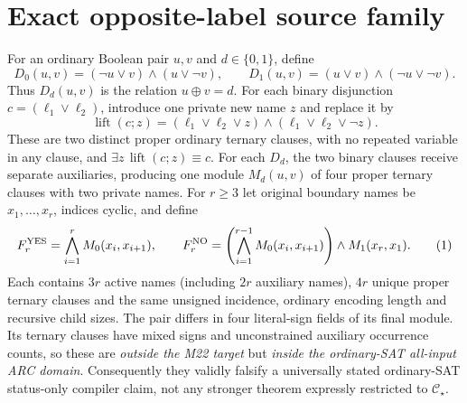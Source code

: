 \documentclass[11pt]{article}
\begin{document}
\section{Exact opposite-label source family}
For an ordinary Boolean pair \(u,v\) and \(d\in\{0,1\}\), define
\[
D_0(u,v)=(\neg u\vee v)\wedge(u\vee\neg v),\qquad
D_1(u,v)=(u\vee v)\wedge(\neg u\vee\neg v).
\]
Thus \(D_d(u,v)\) is the relation \(u\oplus v=d\).
For each binary disjunction \(c=(\ell_1\vee\ell_2)\), introduce one private new name \(z\) and replace it by
\[
\operatorname{lift}(c;z)
=(\ell_1\vee\ell_2\vee z)\wedge
(\ell_1\vee\ell_2\vee\neg z).
\]
These are two distinct proper ordinary ternary clauses, with no repeated variable in any clause, and \(\exists z\,\operatorname{lift}(c;z)\equiv c\). For each \(D_d\), the two binary clauses receive separate auxiliaries, producing one module \(M_d(u,v)\) of four proper ternary clauses with two private names. For \(r\ge3\) let original boundary names be \(x_1,\ldots,x_r\), indices cyclic, and define
\[
F_r^{\rm YES}=\bigwedge_{i=1}^r M_0(x_i,x_{i+1}),
\qquad
F_r^{\rm NO}=\left(\bigwedge_{i=1}^{r-1}M_0(x_i,x_{i+1})\right)\wedge M_1(x_r,x_1).
\tag{1}
\]
Each contains \(3r\) active names (including \(2r\) auxiliary names), \(4r\) unique proper ternary clauses and the same unsigned incidence, ordinary encoding length and recursive child sizes. The pair differs in four literal-sign fields of its final module. Its ternary clauses have mixed signs and unconstrained auxiliary occurrence counts, so these are \emph{outside the M22 target} but \emph{inside the ordinary-SAT all-input ARC domain}. Consequently they validly falsify a universally stated ordinary-SAT status-only compiler claim, not any stronger theorem expressly restricted to \(\mathcal C_\star\).
\end{document}
